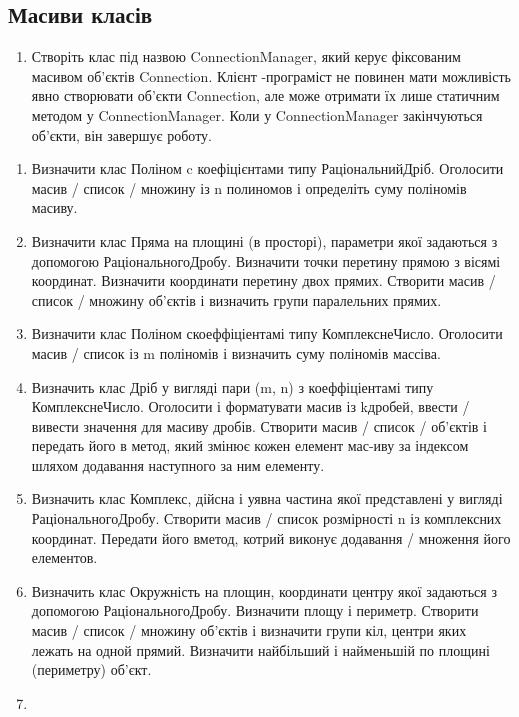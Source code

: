 \documentclass[]{article}
\begin{document}
\subsection{Масиви класів}  

\begin{enumerate}
\def\labelenumi{4.\arabic{enumi}.}
\item
 Створіть клас під назвою ConnectionManager, який керує фіксованим масивом об’єктів Connection. Клієнт -програміст не повинен мати можливість явно створювати об'єкти Connection, але може отримати їх лише статичним методом у ConnectionManager. Коли у ConnectionManager закінчуються об'єкти, він завершує роботу. 
\end{enumerate}

\begin{enumerate}
\def\labelenumi{4.\arabic{enumi}.}
\item
Визначити клас Поліном c коефіцієнтами типу РаціональнийДріб. Оголосити масив / список / множину із n полиномов і определіть суму поліномів масиву.
\item
Визначити клас Пряма на площині (в просторі), параметри якої задаються з допомогою РаціональногоДробу. Визначити точки перетину прямою з вісямі координат. Визначити координати перетину двох прямих. Створити масив / список / множину об'єктів і визначить групи паралельних прямих.
\item
Визначити клас Поліном скоеффіціентамі типу КомплекснеЧисло. Оголосити масив / список  із m поліномів і визначить суму поліномів массіва.
\item
Визначить клас Дріб у вигляді пари (m, n) з коеффіціентамі типу КомплекснеЧисло. Оголосити і форматувати масив із kдробей, ввести / вивести значення для масиву дробів. Створити масив / список /  об'єктів і передать його в метод, який змінює кожен елемент мас-иву за індексом шляхом додавання наступного за ним елементу.
\item
Визначить клас Комплекс, дійсна і уявна частина якої представлені у вигляді РаціональногоДробу. Створити масив / список  розмірності n із комплексних координат. Передати його вметод, котрий виконує додавання / множення його елементов.
\item
Визначить клас Окружність на площин, координати центру якої задаються з допомогою РаціональногоДробу. Визначити площу і периметр. Створити масив / список / множину об'єктів і визначити групи кіл, центри яких лежать на одной прямий. Визначити найбільший і найменьшій по площині (периметру) об'єкт.
\item

\end{enumerate}
\end{document}
